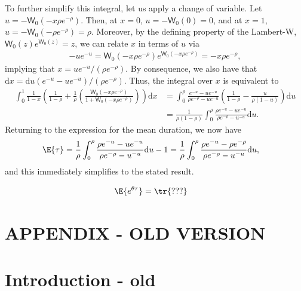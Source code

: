 To further simplify this integral, let us apply a change of variable. Let $u = - \mathsf{W}_0(-x\rho e^{-\rho})$. Then, at $x=0$, $u = -\mathsf{W}_0(0) = 0$, and at $x=1$, $u = -\mathsf{W}_0(-\rho e^{-\rho}) = \rho$. Moreover, by the defining property of the Lambert-W, $\mathsf{W}_0(z) e^{\mathsf{W}_0(z)} = z$, we can relate $x$ in terms of $u$ via
\begin{align}
-u e^{-u} = \mathsf{W}_0(-x\rho e^{-\rho}) e^{\mathsf{W}_0(-x\rho e^{-\rho})} = - x \rho e^{-\rho}
,
\end{align}
implying that $x = u e^{-u} / (\rho e^{-\rho})$. By consequence, we also have that $\mathrm{d}x = \mathrm{d}u (e^{-u} - u e^{-u})/(\rho e^{-\rho})$. Thus, the integral over $x$ is equivalent to
\begin{align}
\int_0^1\frac{1}{1-x}\left(\frac{1}{1-\rho} +  \frac{1}{\rho}
\left(
\frac{\mathsf{W}_0\left(-x \rho e^{-\rho}\right)}
{1 + \mathsf{W}_0\left(-x \rho e^{-\rho}\right)}
\right)\right)\mathrm{d}x
&=
\int_0^\rho
\frac{e^{-u} - u e^{-u}}{\rho e^{-\rho} - u e^{-u}}
\left(
\frac{1}{1-\rho}
-
\frac{u}{\rho(1-u)}
\right)
\mathrm{d}u
\\
&=
\frac{1}{\rho(1-\rho)}
\int_0^\rho
\frac{\rho e^{-u} - u e^{-u}}{\rho e^{-\rho} - u^{-u}} \mathrm{d}u
.
\end{align}
Returning to the expression for the mean duration, we now have
\begin{align}
\E{\tau}
&=
\frac{1}{\rho}
\int_0^\rho
\frac{\rho e^{-u} - u e^{-u}}{\rho e^{-\rho} - u^{-u}} 
\mathrm{d}u
-
1
=
\frac{1}{\rho}
\int_0^\rho
\frac{\rho e^{-u} - \rho e^{-\rho}}{\rho e^{-\rho} - u^{-u}} 
\mathrm{d}u
,
\end{align}
and this immediately simplifies to the stated result.
\hfill\Halmos\endproof



\begin{theorem}
\begin{align}
\E{e^{\theta \tau}}
&=
\tr{???}
\end{align}
\end{theorem}



\newpage 

\section{APPENDIX - OLD VERSION}

\section{Introduction - old}

